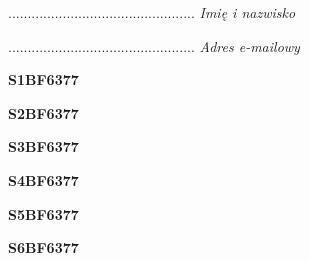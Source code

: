 \begin{turn}{90}\begin{minipage}{\linewidth} \vspace{20mm} ................................................  \textit{Imię i nazwisko}\end{minipage}\end{turn}

\begin{turn}{90}\begin{minipage}{\linewidth} \vspace{20mm} ................................................  \textit{Adres e-mailowy}\end{minipage}\end{turn}

\begin{turn}{90}\huge \begin{minipage}{\linewidth} \vspace{10mm}\textbf{S1BF6377}\end{minipage}\end{turn}

\begin{turn}{90}\huge \begin{minipage}{\linewidth} \vspace{10mm}\textbf{S2BF6377}\end{minipage}\end{turn}

\begin{turn}{90}\huge \begin{minipage}{\linewidth} \vspace{10mm}\textbf{S3BF6377}\end{minipage}\end{turn}

\begin{turn}{90}\huge \begin{minipage}{\linewidth} \vspace{10mm}\textbf{S4BF6377}\end{minipage}\end{turn}

\begin{turn}{90}\huge \begin{minipage}{\linewidth} \vspace{10mm}\textbf{S5BF6377}\end{minipage}\end{turn}

\begin{turn}{90}\huge \begin{minipage}{\linewidth} \vspace{10mm}\textbf{S6BF6377}\end{minipage}\end{turn}

